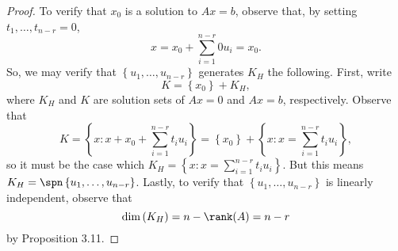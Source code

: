 \documentclass[linearalgebraI]{subfiles}
\begin{document}
    \begin{proof}
        To verify that $x_0$ is a solution to $Ax=b$, observe that, by setting $t_1, \ldots, t_{n-r} = 0$,
        \begin{equation*}
            x = x_0 + \sum^{n-r}_{i=1} 0u_i = x_0.
        \end{equation*}
        So, we may verify that $\left\lbrace u_1, \ldots, u_{n-r} \right\rbrace$ generates $K_H$ the following. First, write
        \begin{equation*}
            K = \left\lbrace x_0 \right\rbrace + K_H,
        \end{equation*}
        where $K_H$ and $K$ are solution sets of $Ax=0$ and $Ax=b$, respectively. Observe that
        \begin{equation*}
            K = \left\lbrace x: x + x_0 + \sum^{n-r}_{i=1} t_iu_i \right\rbrace = \left\lbrace x_0 \right\rbrace + \left\lbrace x: x=\sum^{n-r}_{i=1} t_iu_i \right\rbrace,
        \end{equation*}
        so it must be the case which $K_H = \left\lbrace x: x=\sum^{n-r}_{i=1} t_iu_i \right\rbrace$. But this means $K_H = \spn \left\lbrace u_1, \ldots, u_{n-r} \right\rbrace$. Lastly, to verify that $\left\lbrace u_1, \ldots, u_{n-r} \right\rbrace$ is linearly independent, observe that
        \begin{equation*}
            \dim\left( K_H \right)  = n-\rank(A) = n-r
        \end{equation*}
        by Proposition 3.11.
    \end{proof}
\end{document}
